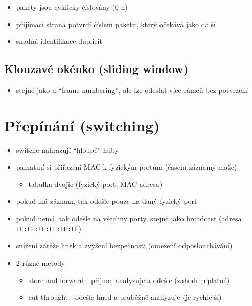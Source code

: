 \documentclass{szzclass}
\providecommand{\tightlist}{%
  \setlength{\itemsep}{0pt}\setlength{\parskip}{0pt}}
\begin{document}
\begin{itemize}
\tightlist
\item
  pakety jsou cyklicky číslovány (0-n)
\item
  přijímací strana potvrdí číslem paketu, který očekává jako další
\item
  snadná identifikace duplicit
\end{itemize}

\hypertarget{klouzavuxe9-okuxe9nko-sliding-window}{%
\subsection{Klouzavé okénko (sliding
window)}\label{klouzavuxe9-okuxe9nko-sliding-window}}

\begin{itemize}
\tightlist
\item
  stejné jako u ``frame numbering'', ale lze odeslat více rámců bez
  potvrzení
\end{itemize}

\hypertarget{pux159epuxednuxe1nuxed-switching}{%
\section{Přepínání
(switching)}\label{pux159epuxednuxe1nuxed-switching}}

\begin{itemize}
\tightlist
\item
  switche nahrazují ``hloupé'' huby
\item
  pamatují si přiřazení MAC k fyzickým portům (časem záznamy maže)

  \begin{itemize}
  \tightlist
  \item
    tabulka dvojic (fyzický port, MAC adresa)
  \end{itemize}
\item
  pokud má záznam, tak odešle pouze na daný fyzický port
\item
  pokud nemá, tak odešle na všechny porty, stejně jako broadcast (adresa
  \texttt{FF:FF:FF:FF:FF:FF})
\item
  snížení zátěže linek a zvýšení bezpečnosti (omezení odposlouchávání)
\item
  2 různé metody:

  \begin{itemize}
  \tightlist
  \item
    store-and-forward - přijme, analyzuje a odešle (zahodí neplatné)
  \item
    cut-throught - odešle hned a průběžně analyzuje (je rychlejší)
  \end{itemize}
\end{itemize}
\end{document}
